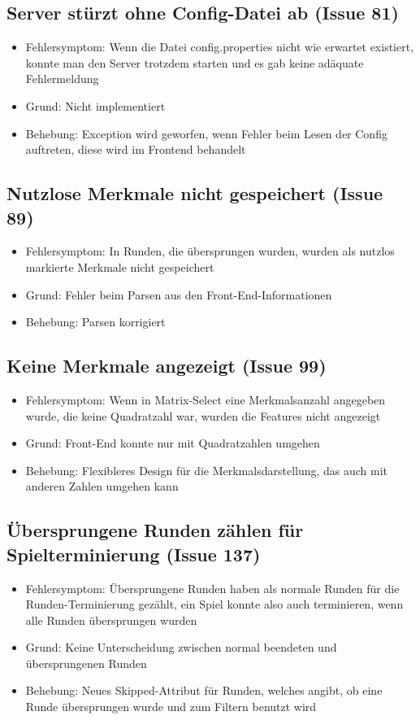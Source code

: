 \documentclass[a4paper]{scrreprt}
\begin{document}
    \subsection{Server stürzt ohne Config-Datei ab (Issue 81)}
    \begin{itemize}
    \item Fehlersymptom: Wenn die Datei config.properties nicht wie erwartet
     existiert, konnte man den Server trotzdem starten und es gab keine
     adäquate Fehlermeldung
    \item Grund: Nicht implementiert
    \item Behebung: Exception wird geworfen, wenn Fehler beim Lesen der Config
     auftreten, diese wird im Frontend behandelt
    \end{itemize}

    \subsection{Nutzlose Merkmale nicht gespeichert (Issue 89)}
    \begin{itemize}
    \item Fehlersymptom: In Runden, die übersprungen wurden, wurden als nutzlos
     markierte Merkmale nicht gespeichert
    \item Grund: Fehler beim Parsen aus den Front-End-Informationen
    \item Behebung: Parsen korrigiert
    \end{itemize}

    \subsection{Keine Merkmale angezeigt (Issue 99)}
    \begin{itemize}
    \item Fehlersymptom: Wenn in Matrix-Select eine Merkmalsanzahl angegeben wurde,
    die keine Quadratzahl war, wurden die Features nicht angezeigt
    \item Grund: Front-End konnte nur mit Quadratzahlen umgehen
    \item Behebung: Flexibleres Design für die Merkmalsdarstellung, das auch mit anderen
     Zahlen umgehen kann
    \end{itemize}

    \subsection{Übersprungene Runden zählen für Spielterminierung (Issue 137)}
    \begin{itemize}
    \item Fehlersymptom: Übersprungene Runden haben als normale Runden für die
     Runden-Terminierung gezählt, ein Spiel konnte also auch terminieren, wenn alle
      Runden übersprungen wurden
    \item Grund: Keine Unterscheidung zwischen normal beendeten und übersprungenen
     Runden 
    \item Behebung: Neues Skipped-Attribut für Runden, welches angibt, ob eine
     Runde übersprungen wurde und zum Filtern benutzt wird
    \end{itemize}
\end{document}
